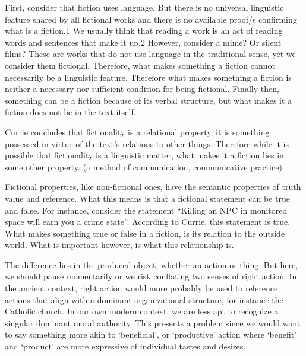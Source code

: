 \documentclass[
  letterpaper,
  DIV=11,
  numbers=noendperiod]{scrreprt}
\begin{document}
\begin{tcolorbox}[enhanced jigsaw, arc=.35mm, breakable, rightrule=.15mm, colback=white, colframe=quarto-callout-important-color-frame, bottomrule=.15mm, leftrule=.75mm, opacityback=0, toprule=.15mm, left=2mm]
\begin{tcolorbox}[enhanced jigsaw, arc=.35mm, breakable, rightrule=.15mm, colback=white, colframe=quarto-callout-tip-color-frame, bottomrule=.15mm, leftrule=.75mm, opacityback=0, toprule=.15mm, left=2mm]
First, consider that fiction uses language. But there is no universal
linguistic feature shared by all fictional works and there is no
available proof/s confirming what is a fiction.1 We usually think that
reading a work is an act of reading words and sentences that make it
up.2 However, consider a mime? Or silent films? These are works that do
not use language in the traditional sense, yet we consider them
fictional. Therefore, what makes something a fiction cannot necessarily
be a linguistic feature. Therefore what makes something a fiction is
neither a necessary nor sufficient condition for being fictional.
Finally then, something can be a fiction because of its verbal
structure, but what makes it a fiction does not lie in the text itself.

Currie concludes that fictionality is a relational property, it is
something possessed in virtue of the text's relations to other things.
Therefore while it is possible that fictionality is a linguistic matter,
what makes it a fiction lies in some other property. (a method of
communication, communicative practice)

Fictional properties, like non-fictional ones, have the semantic
properties of truth value and reference. What this means is that a
fictional statement can be true and false. For instance, consider the
statement ``Killing an NPC in monitored space will earn you a crime
state''. According to Currie, this statement is true. What makes
something true or false in a fiction, is its relation to the outside
world. What is important however, is what this relationship is.

The difference lies in the produced object, whether an action or thing.
But here, we should pause momentarily or we risk conflating two senses
of right action. In the ancient context, right action would more
probably be used to reference actions that align with a dominant
organizational structure, for instance the Catholic church. In our own
modern context, we are less apt to recognize a singular dominant moral
authority. This presents a problem since we would want to say something
more akin to `beneficial', or `productive' action where `benefit' and
`product' are more expressive of individual tastes and desires.


\end{tcolorbox}
\end{tcolorbox}
\end{document}
